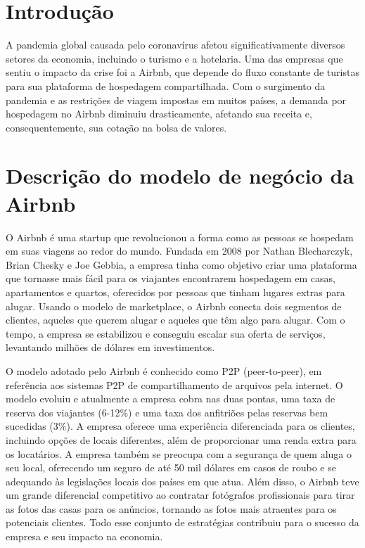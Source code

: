 \documentclass{article}
\begin{document}
\section*{Introdução}
\normalsize \onehalfspacing
A pandemia global causada pelo coronavírus afetou significativamente diversos setores da economia, incluindo o turismo e a hotelaria. Uma das empresas que sentiu o impacto da crise foi a Airbnb, que depende do fluxo constante de turistas para sua plataforma de hospedagem compartilhada. Com o surgimento da pandemia e as restrições de viagem impostas em muitos países, a demanda por hospedagem no Airbnb diminuiu drasticamente, afetando sua receita e, consequentemente, sua cotação na bolsa de valores.

\newpage
\section*{Descrição do modelo de negócio da Airbnb}
O Airbnb é uma startup que revolucionou a forma como as pessoas se hospedam em suas viagens ao redor do mundo. Fundada em 2008 por Nathan Blecharczyk, Brian Chesky e Joe Gebbia, a empresa tinha como objetivo criar uma plataforma que tornasse mais fácil para os viajantes encontrarem hospedagem em casas, apartamentos e quartos, oferecidos por pessoas que tinham lugares extras para alugar. Usando o modelo de marketplace, o Airbnb conecta dois segmentos de clientes, aqueles que querem alugar e aqueles que têm algo para alugar. Com o tempo, a empresa se estabilizou e conseguiu escalar sua oferta de serviços, levantando milhões de dólares em investimentos.

O modelo adotado pelo Airbnb é conhecido como P2P (peer-to-peer), em referência aos sistemas P2P de compartilhamento de arquivos pela internet. O modelo evoluiu e atualmente a empresa cobra nas duas pontas, uma taxa de reserva dos viajantes (6-12\%) e uma taxa dos anfitriões pelas reservas bem sucedidas (3\%). A empresa oferece uma experiência diferenciada para os clientes, incluindo opções de locais diferentes, além de proporcionar uma renda extra para os locatários. A empresa também se preocupa com a segurança de quem aluga o seu local, oferecendo um seguro de até 50 mil dólares em casos de roubo e se adequando às legislações locais dos países em que atua. Além disso, o Airbnb teve um grande diferencial competitivo ao contratar fotógrafos profissionais para tirar as fotos das casas para os anúncios, tornando as fotos mais atraentes para os potenciais clientes. Todo esse conjunto de estratégias contribuiu para o sucesso da empresa e seu impacto na economia.
\end{document}
